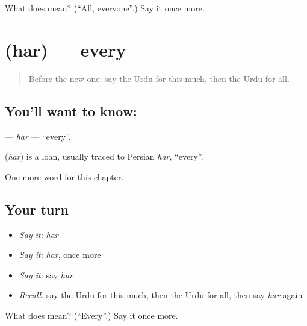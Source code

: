 \begin{tcolorbox}[breakable,colback=teal!4,colframe=teal!35!black,title={Before you move on}]
What does  mean? (\textquotedblleft{}All, everyone\textquotedblright{}.) Say it once more.
\end{tcolorbox}
\section[\texorpdfstring{\ur{ہر} (har)}{ہر (har)}]{ (har) — every}

\label{lesson:UR-C89-har}



\begin{quote}
Before the new one: say the Urdu for this much, then the Urdu for all.
\end{quote}

\subsection*{You'll want to know: }
\textbf{} — \emph{har} — \textquotedblleft{}every\textquotedblright{}.

\begin{cousinweb}
\textbf{} (\emph{har}) is a loan, usually traced to Persian \emph{har}, \textquotedblleft{}every\textquotedblright{}.
\end{cousinweb}

\begin{grammarlens}[title={What you've built}]
One more word for this chapter.
\end{grammarlens}

\subsection*{Your turn}
\begin{itemize}
\raggedright
  \item \emph{Say it:} \emph{har}
  \item \emph{Say it:} \emph{har}, once more
  \item \emph{Say it:} say \emph{har}
  \item \emph{Recall:} say the Urdu for this much, then the Urdu for all, then say \emph{har} again
\end{itemize}

\begin{tcolorbox}[breakable,colback=teal!4,colframe=teal!35!black,title={Before you move on}]
What does  mean? (\textquotedblleft{}Every\textquotedblright{}.) Say it once more.
\end{tcolorbox}
